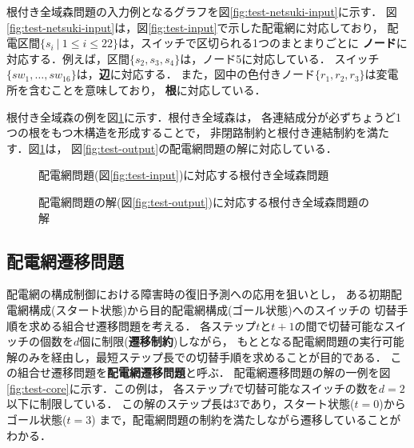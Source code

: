根付き全域森問題の入力例となるグラフを図\ref{fig:test-netsuki-input}に示す．
図\ref{fig:test-netsuki-input}は，図\ref{fig:test-input}で示した配電網に対応しており，
配電区間$\{s_i ~|~ 1 \leq i \leq 22\}$は，スイッチで区切られる1つのまとまりごとに
\textbf{ノード}に対応する．例えば，区間$\{s_2,s_3,s_4\}$は，ノード5に対応している．
スイッチ$\{sw_1,\ldots,sw_{16}\}$は，\textbf{辺}に対応する．
また，図中の色付きノード$\{r_1,r_2,r_3\}$は変電所を含むことを意味しており，
\textbf{根}に対応している．

根付き全域森の例を図\ref{fig:test-netsuki-output}に示す．根付き全域森は，
各連結成分が必ずちょうど1つの根をもつ木構造を形成することで，
非閉路制約と根付き連結制約を満たす．図\ref{fig:test-netsuki-output}は，
図\ref{fig:test-output}の配電網問題の解に対応している．

\begin{figure}[tbp]
 \centering
 \begin{minipage}[b]{0.45\linewidth}
  \centering
  \scalebox{0.6}{}
  \caption{配電網問題(図\ref{fig:test-input})に対応する根付き全域森問題}
  \label{fig:test-netsuki-input}
 \end{minipage}
 \begin{minipage}[b]{0.45\linewidth}
  \centering
  \scalebox{0.6}{}
  \caption{配電網問題の解(図\ref{fig:test-output})に対応する根付き全域森問題の解}
  \label{fig:test-netsuki-output}
 \end{minipage}
\end{figure}  

\subsection{配電網遷移問題}
配電網の構成制御における障害時の復旧予測への応用を狙いとし，
ある初期配電網構成(スタート状態)から目的配電網構成(ゴール状態)へのスイッチの
切替手順を求める組合せ遷移問題を考える．%
各ステップ$t$と$t+1$の間で切替可能なスイッチの個数を$d$個に制限(\textbf{遷移制約})しながら，
もととなる配電網問題の実行可能解のみを経由し，最短ステップ長での切替手順を求めることが目的である．
この組合せ遷移問題を\textbf{配電網遷移問題}と呼ぶ．
配電網遷移問題の解の一例を図\ref{fig:test-core}に示す．この例は，
各ステップ$t$で切替可能なスイッチの数を$d=2$以下に制限している．
この解のステップ長は3であり，スタート状態($t=0$)からゴール状態($t=3$)
まで，配電網問題の制約を満たしながら遷移していることがわかる．


